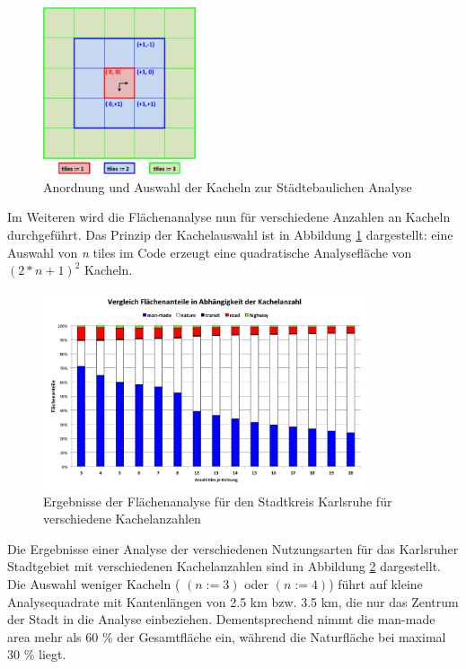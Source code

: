 \documentclass[12pt,a4paper]{scrartcl}
\begin{document}
%
\begin{figure}
  \centering
    \includegraphics[width=0.4\textwidth]{Auswahl_tiles.png}
    \caption{Anordnung und Auswahl der Kacheln zur Städtebaulichen Analyse}
    \label{fig:Auswahl_tiles}
\end{figure}
%
Im Weiteren wird die Flächenanalyse nun für verschiedene Anzahlen an Kacheln durchgeführt. Das Prinzip der Kachelauswahl ist in Abbildung \ref{fig:Auswahl_tiles} dargestellt: eine Auswahl von \textit{n} tiles im Code erzeugt eine quadratische Analysefläche von \((2*n+1)^2\) Kacheln.\\
%
\newline
\begin{figure}
  \centering
    \includegraphics[width=0.85\textwidth]{Kachelvergleich_KA.png}
    \caption{Ergebnisse der Flächenanalyse für den Stadtkreis Karlsruhe für verschiedene Kachelanzahlen}
    \label{fig:Kachel_vgl}
\end{figure}
%
Die Ergebnisse einer Analyse der verschiedenen Nutzungsarten für das Karlsruher Stadtgebiet mit verschiedenen Kachelanzahlen sind in Abbildung \ref{fig:Kachel_vgl} dargestellt.\\
Die Auswahl weniger Kacheln ( \((n:=3)\) oder  \((n:=4)\)) führt auf kleine Analysequadrate mit Kantenlängen von \num{2.5} \si{\kilo\metre} bzw. \num{3.5} \si{\kilo\metre}, die nur das Zentrum der Stadt in die Analyse einbeziehen. Dementsprechend nimmt die man-made area mehr als \num{60} \% der Gesamtfläche ein, während die Naturfläche bei maximal \num{30} \% liegt.\\
\end{document}
